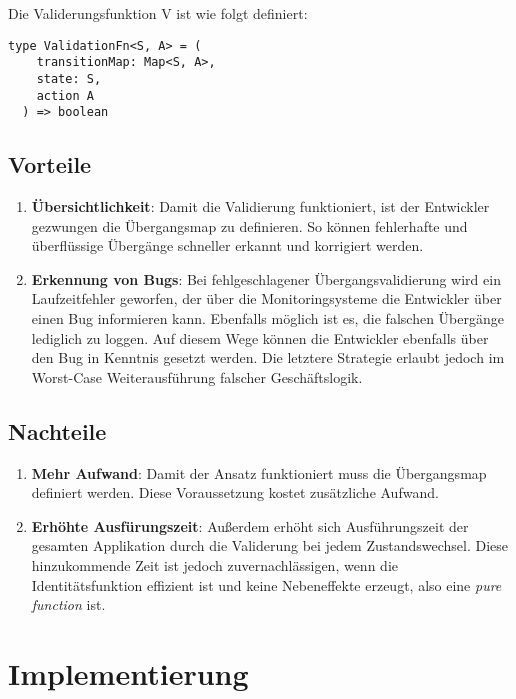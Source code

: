 Die Validerungsfunktion V ist wie folgt definiert:

\begin{lstlisting}
type ValidationFn<S, A> = (
    transitionMap: Map<S, A>,
    state: S,
    action A
  ) => boolean
\end{lstlisting}

\subsection{Vorteile}

\begin{enumerate}
  \item \textbf{Übersichtlichkeit}: Damit die Validierung funktioniert, ist der Entwickler gezwungen die Übergangsmap zu definieren. So können fehlerhafte und überflüssige Übergänge schneller erkannt und korrigiert werden.
  \item \textbf{Erkennung von Bugs}: Bei fehlgeschlagener Übergangsvalidierung wird ein Laufzeitfehler geworfen, der über die Monitoringsysteme die Entwickler über einen Bug informieren kann. Ebenfalls möglich ist es, die falschen Übergänge lediglich zu loggen. Auf diesem Wege können die Entwickler ebenfalls über den Bug in Kenntnis gesetzt werden. Die letztere Strategie erlaubt jedoch im Worst-Case Weiterausführung falscher Geschäftslogik.
\end{enumerate}

\subsection{Nachteile}

\begin{enumerate}
  \item \textbf{Mehr Aufwand}: Damit der Ansatz funktioniert muss die Übergangsmap definiert werden. Diese Voraussetzung kostet zusätzliche Aufwand.
  \item \textbf{Erhöhte Ausfürungszeit}: Außerdem erhöht sich Ausführungszeit der gesamten Applikation durch die Validerung bei jedem Zustandswechsel. Diese hinzukommende Zeit ist jedoch zuvernachlässigen, wenn die Identitätsfunktion effizient ist und keine Nebeneffekte erzeugt, also eine \textit{pure function} ist.
\end{enumerate}

\section{Implementierung}

